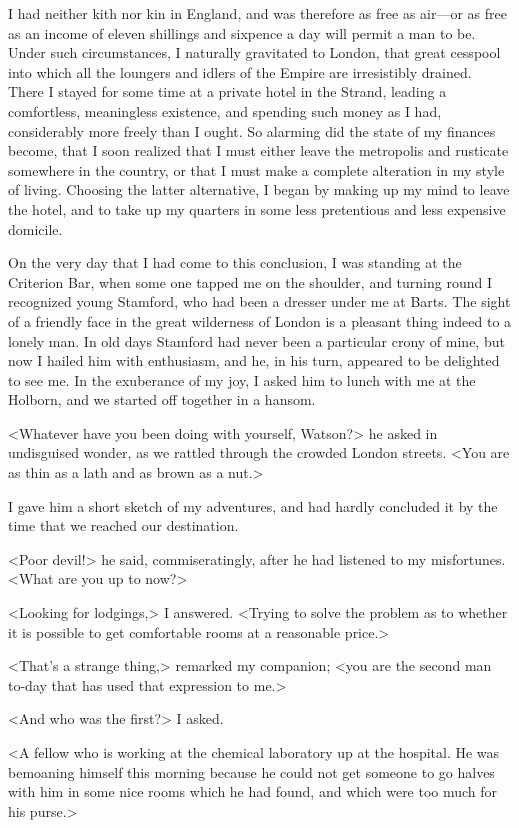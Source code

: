I had neither kith nor kin in England, and was therefore as free as air—or as free as an income of eleven shillings and sixpence a day will permit a man to be. Under such circumstances, I naturally gravitated to London, that great cesspool into which all the loungers and idlers of the Empire are irresistibly drained. There I stayed for some time at a private hotel in the Strand, leading a comfortless, meaningless existence, and spending such money as I had, considerably more freely than I ought. So alarming did the state of my finances become, that I soon realized that I must either leave the metropolis and rusticate somewhere in the country, or that I must make a complete alteration in my style of living. Choosing the latter alternative, I began by making up my mind to leave the hotel, and to take up my quarters in some less pretentious and less expensive domicile.

On the very day that I had come to this conclusion, I was standing at the Criterion Bar, when some one tapped me on the shoulder, and turning round I recognized young Stamford, who had been a dresser under me at Barts. The sight of a friendly face in the great wilderness of London is a pleasant thing indeed to a lonely man. In old days Stamford had never been a particular crony of mine, but now I hailed him with enthusiasm, and he, in his turn, appeared to be delighted to see me. In the exuberance of my joy, I asked him to lunch with me at the Holborn, and we started off together in a hansom.

<Whatever have you been doing with yourself, Watson?> he asked in undisguised wonder, as we rattled through the crowded London streets. <You are as thin as a lath and as brown as a nut.>

I gave him a short sketch of my adventures, and had hardly concluded it by the time that we reached our destination.

<Poor devil!> he said, commiseratingly, after he had listened to my misfortunes. <What are you up to now?>

<Looking for lodgings,> I answered. <Trying to solve the problem as to whether it is possible to get comfortable rooms at a reasonable price.>

<That's a strange thing,> remarked my companion; <you are the second man to-day that has used that expression to me.>

<And who was the first?> I asked.

<A fellow who is working at the chemical laboratory up at the hospital. He was bemoaning himself this morning because he could not get someone to go halves with him in some nice rooms which he had found, and which were too much for his purse.>

